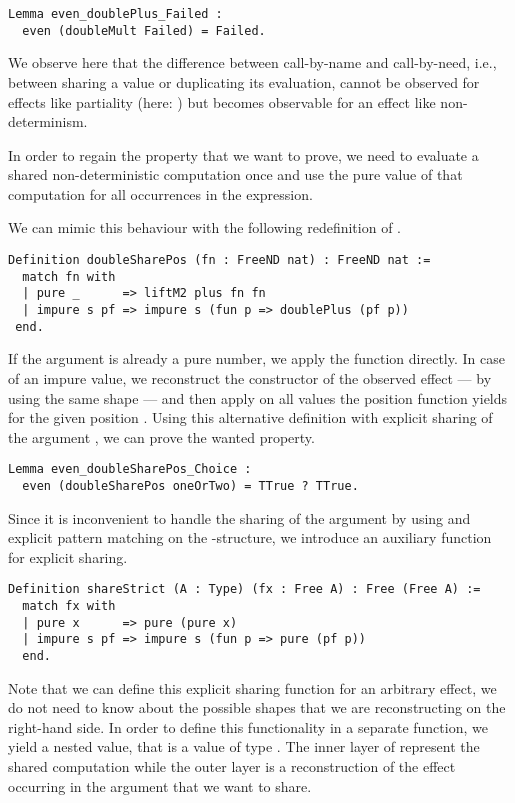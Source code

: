 \begin{verbatim}
Lemma even_doublePlus_Failed :
  even (doubleMult Failed) = Failed.
\end{verbatim}

We observe here that the difference between call-by-name and call-by-need, i.e., between sharing a value or duplicating its evaluation, cannot be observed for effects like partiality (here: ) but becomes observable for an effect like non-determinism.

In order to regain the property that we want to prove, we need to evaluate a shared non-deterministic computation once and use the pure value of that computation for all occurrences in the expression.

We can mimic this behaviour with the following redefinition of .

\begin{verbatim}
Definition doubleSharePos (fn : FreeND nat) : FreeND nat :=
  match fn with
  | pure _      => liftM2 plus fn fn
  | impure s pf => impure s (fun p => doublePlus (pf p))
 end.
\end{verbatim}

If the argument  is already a pure number, we apply the function  directly.
In case of an impure value, we reconstruct the constructor of the observed effect --- by using the same shape  --- and then apply  on all values the position function  yields for the given position .
Using this alternative definition with explicit sharing of the argument , we can prove the wanted property.

\begin{verbatim}
Lemma even_doubleSharePos_Choice :
  even (doubleSharePos oneOrTwo) = TTrue ? TTrue.
\end{verbatim}

Since it is inconvenient to handle the sharing of the argument  by using and explicit pattern matching on the -structure, we introduce an auxiliary function for explicit sharing.

\begin{verbatim}
Definition shareStrict (A : Type) (fx : Free A) : Free (Free A) :=
  match fx with
  | pure x      => pure (pure x)
  | impure s pf => impure s (fun p => pure (pf p))
  end.
\end{verbatim}

Note that we can define this explicit sharing function for an arbitrary effect, we do not need to know about the possible shapes that we are reconstructing on the right-hand side.
In order to define this functionality in a separate function, we yield a nested value, that is a value of type .
The inner layer of  represent the shared computation while the outer layer is a reconstruction of the effect occurring in the argument  that we want to share.

